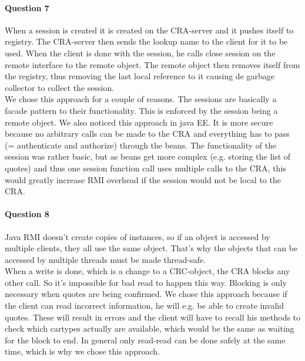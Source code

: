 \documentclass{ds-report}
\begin{document}
	\paragraph{Question 7} 
	When a session is created it is created on the CRA-server and it pushes itself to registry. The CRA-server then sends the lookup name to the client for it to be used. When the client is done with the session, he calls close session on the remote interface to the remote object. The remote object then removes itself from the registry, thus removing the last local reference to it causing de garbage collector to collect the session. \\
	
	We chose this approach for a couple of reasons.
	The sessions are basically a facade pattern to their functionality. This is enforced by the session being a remote object.
	We also noticed this approach in java EE.
	It is more secure because no arbitrary calls can be made to the CRA and everything has to pass (= authenticate and authorize) through the beans.
	The functionality of the session was rather basic, but as beans get more complex (e.g. storing the list of quotes) and thus one session function call uses multiple calls to the CRA, this would greatly increase RMI overhead if the session would not be local to the CRA.
	
	\paragraph{Question 8} 
	Java RMI doesn't create copies of instances, so if an object is accessed by multiple clients, they all use the same object. That's why the objects that can be accessed by multiple threads must be made thread-safe.\\
	
	
	When a write is done, which is a change to a CRC-object, the CRA blocks any other call. So it's impossible for bad read to happen this way. Blocking is only necessary when quotes are being confirmed. We chose this approach because if the client can read incorrect information, he will e.g. be able to create invalid quotes. These will result in errors and the client will have to recall his methods to check which cartypes actually are available, which would be the same as waiting for the block to end.
	In general only read-read can be done safely at the same time, which is why we chose this approach.
	 
	
\end{document}
